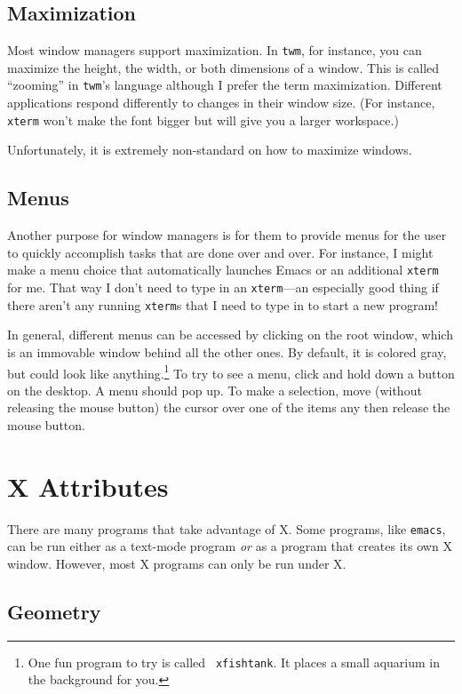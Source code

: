 \subsection{Maximization}

Most window managers support maximization.  In {\tt twm}, for
instance, you can maximize the height, the width, or both dimensions
of a window. This is called ``zooming'' in {\tt twm}'s language
although I prefer the term maximization.  Different applications
respond differently to changes in their window size. (For instance,
{\tt xterm} won't make the font bigger but will give you a larger
workspace.)

Unfortunately, it is extremely non-standard on how to maximize windows.

\subsection{Menus}\label{x-menus}

Another purpose for window managers is for them to provide menus for
the user to quickly accomplish tasks that are done over and over.  For
instance, I might make a menu choice that automatically launches Emacs
or an additional {\tt xterm} for me. That way I don't need to type in
an {\tt xterm}---an especially good thing if there aren't any running
{\tt xterm}s that I need to type in to start a new program!

In general, different menus can be accessed by clicking on the root
window, which is an immovable window behind all the other ones. By
default, it is colored gray, but could look like
anything.\footnote{One fun program to try is called {\tt
    xfishtank}.  It places a small aquarium in the
  background for you.} To try to see a menu, click and hold down a
button on the desktop. A menu should pop up. To make a selection, move
(without releasing the mouse button) the cursor over one of the items
any then release the mouse button.

\section{X Attributes}

There are many programs that take advantage of X. Some programs, like
{\tt emacs}, can be run either as a text-mode program
{\em or\/} as a program that creates its own X window. However, most X
programs can only be run under X.

\subsection{Geometry}

